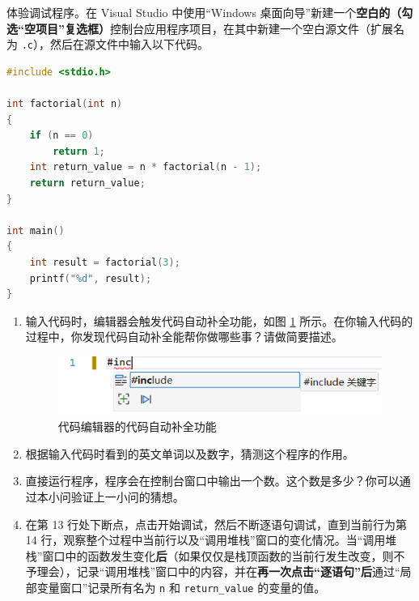 
\begin{problemset}
	\item 体验调试程序。在 Visual Studio 中使用“Windows 桌面向导”新建一个\textbf{空白的（勾选“空项目”复选框）}控制台应用程序项目，在其中新建一个空白源文件（扩展名为 \lstinline{.c}），然后在源文件中输入以下代码。

	\begin{lstlisting}[language=c, moreemph={[2]factorial}]
#include <stdio.h>

int factorial(int n)
{
	if (n == 0)
		return 1;
	int return_value = n * factorial(n - 1);
	return return_value;
}

int main()
{
	int result = factorial(3);
	printf("%d", result);
}
	\end{lstlisting}

	\begin{enumerate}
		\item 输入代码时，编辑器会触发代码自动补全功能，如图 \ref{pic:auto_complete} 所示。在你输入代码的过程中，你发现代码自动补全能帮你做哪些事？请做简要描述。

		\begin{figure}[H]
			\centering
			\includegraphics[width=0.6\linewidth]{pic/auto-complete.png}
			\caption{代码编辑器的代码自动补全功能}
			\label{pic:auto_complete}
		\end{figure}

		\item 根据输入代码时看到的英文单词以及数字，猜测这个程序的作用。

		\item 直接运行程序，程序会在控制台窗口中输出一个数。这个数是多少？你可以通过本小问验证上一小问的猜想。

		\item 在第 13 行处下断点，点击开始调试，然后不断逐语句调试，直到当前行为第 14 行，观察整个过程中当前行以及“调用堆栈”窗口的变化情况。当“调用堆栈”窗口中的函数发生变化\textbf{后}（如果仅仅是栈顶函数的当前行发生改变，则不予理会），记录“调用堆栈”窗口中的内容，并在\textbf{再一次点击“逐语句”后}通过“局部变量窗口”记录所有名为 \lstinline{n} 和 \lstinline{return_value} 的变量的值。


\end{enumerate}
\end{problemset}
